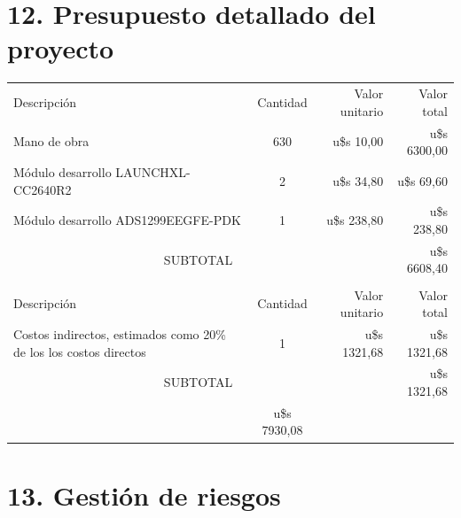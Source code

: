 \documentclass[
11pt, %
codirector, %
]{charter}
\begin{document}


\section{12. Presupuesto detallado del proyecto}
\label{sec:presupuesto}

\begin{table}[htpb]
\centering
\begin{tabularx}{\linewidth}{@{}|X|c|r|r|@{}}
\hline
\rowcolor[HTML]{C0C0C0} 
\multicolumn{4}{|c|}{\cellcolor[HTML]{C0C0C0}COSTOS DIRECTOS} \\ \hline
\rowcolor[HTML]{C0C0C0} 
 Descripción & Cantidad & Valor unitario & Valor total \\ \hline

 Mano de obra & 630 & u\$s 10,00 & u\$s 6300,00 \\ \hline
 Módulo desarrollo LAUNCHXL-CC2640R2 & 2 & u\$s 34,80 & u\$s 69,60 \\ \hline
 Módulo desarrollo ADS1299EEGFE-PDK & 1 & u\$s 238,80 & u\$s 238,80 \\ \hline
\multicolumn{3}{|c|}{SUBTOTAL} & u\$s 6608,40 \\ \hline
\rowcolor[HTML]{C0C0C0} 
\multicolumn{4}{|c|}{\cellcolor[HTML]{C0C0C0}COSTOS INDIRECTOS} \\ \hline
\rowcolor[HTML]{C0C0C0} 
 Descripción & Cantidad & Valor unitario & Valor total \\ \hline

 Costos indirectos, estimados como 20\% de los los costos directos & 1 & u\$s 1321,68  & u\$s 1321,68  \\ \hline

\multicolumn{3}{|c|}{SUBTOTAL} & u\$s 1321,68 \\ \hline
\rowcolor[HTML]{C0C0C0}
\multicolumn{3}{|c|}{TOTAL} & u\$s 7930,08   \\ \hline
\end{tabularx}%
\end{table}


\section{13. Gestión de riesgos}
\label{sec:riesgos}
\end{document}
